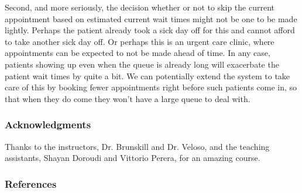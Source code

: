 \documentclass{article} %
\begin{document}
Second, and more seriously, the decision whether or not to skip the current appointment based on estimated current wait times might not be one to be made lightly. Perhaps the patient already took a sick day off for this and cannot afford to take another sick day off. Or perhaps this is an urgent care clinic, where appointments can be expected to not be made ahead of time. In any case, patients showing up even when the queue is already long will exacerbate the patient wait times by quite a bit. We can potentially extend the system to take care of this by booking fewer appointments right before such patients come in, so that when they do come they won't have a large queue to deal with.

\subsubsection*{Acknowledgments}

Thanks to the instructors, Dr. Brunskill and Dr. Veloso, and the teaching assistants, Shayan Doroudi and Vittorio Perera, for an amazing course.

\subsubsection*{References}



\end{document}

